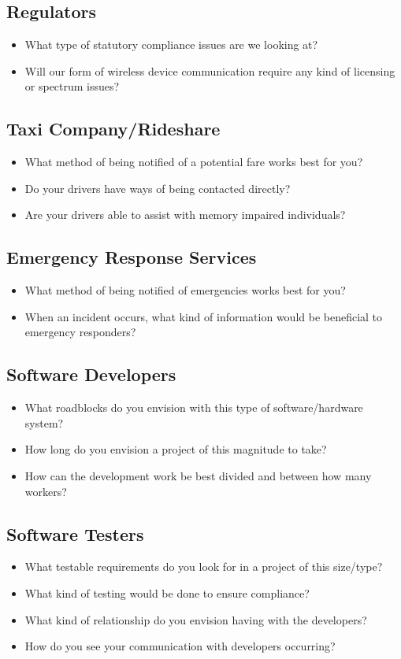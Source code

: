\documentclass[12pt]{article}
\begin{document}
\subsection*{Regulators}
\begin{itemize}
  \item What type of statutory compliance issues are we looking at?
  \item Will our form of wireless device communication require any kind of licensing or spectrum issues?
\end{itemize} 

\subsection*{Taxi Company/Rideshare}
\begin{itemize}
  \item What method of being notified of a potential fare works best for you?
  \item Do your drivers have ways of being contacted directly?
  \item Are your drivers able to assist with memory impaired individuals?
\end{itemize}

\subsection*{Emergency Response Services}
\begin{itemize}
  \item What method of being notified of emergencies works best for you?
  \item When an incident occurs, what kind of information would be beneficial to emergency responders?
\end{itemize}

\subsection*{Software Developers}
\begin{itemize}
  \item What roadblocks do you envision with this type of software/hardware system?
  \item How long do you envision a project of this magnitude to take?
  \item How can the development work be best divided and between how many workers?
\end{itemize} 

\subsection*{Software Testers}
\begin{itemize}
  \item What testable requirements do you look for in a project of this size/type?
  \item What kind of testing would be done to ensure compliance?
  \item What kind of relationship do you envision having with the developers?
  \item How do you see your communication with developers occurring?
\end{itemize}
\end{document}
